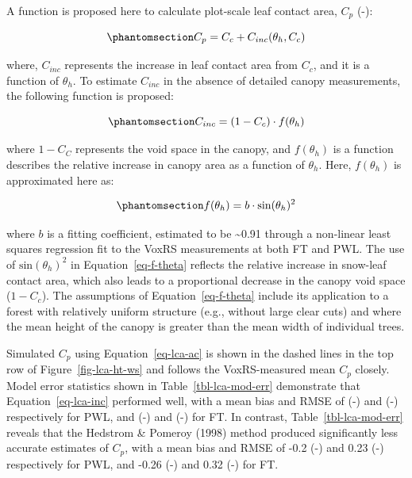 \documentclass[
  letterpaper,
  DIV=11,
  numbers=noendperiod]{scrartcl}
\begin{document}
A function is proposed here to calculate plot-scale leaf contact area,
\(C_p\) (-):

\begin{equation}\phantomsection\label{eq-lca-ac}{
C_p = C_c + C_{inc}(\theta_h, C_c)
}\end{equation}

where, \(C_{inc}\) represents the increase in leaf contact area from
\(C_c\), and it is a function of \(\theta_h\). To estimate \(C_{inc}\)
in the absence of detailed canopy measurements, the following function
is proposed:

\begin{equation}\phantomsection\label{eq-lca-inc}{
C_{inc} = (1-C_c)\cdot f(\theta_h)
}\end{equation}

where \(1-C_C\) represents the void space in the canopy, and
\(f(\theta_h)\) is a function describes the relative increase in canopy
area as a function of \(\theta_h\). Here, \(f(\theta_h)\) is
approximated here as:

\begin{equation}\phantomsection\label{eq-f-theta}{
f(\theta_h) = b \cdot\text{sin}(\theta_h)^2
}\end{equation}

where \(b\) is a fitting coefficient, estimated to be
\textasciitilde0.91 through a non-linear least squares regression fit to
the VoxRS measurements at both FT and PWL. The use of
\(\text{sin}(\theta_h)^2\) in Equation~\ref{eq-f-theta} reflects the
relative increase in snow-leaf contact area, which also leads to a
proportional decrease in the canopy void space (\(1-C_c\)). The
assumptions of Equation~\ref{eq-f-theta} include its application to a
forest with relatively uniform structure (e.g., without large clear
cuts) and where the mean height of the canopy is greater than the mean
width of individual trees.

Simulated \(C_p\) using Equation~\ref{eq-lca-ac} is shown in the dashed
lines in the top row of Figure~\ref{fig-lca-ht-ws} and follows the
VoxRS-measured mean \(C_p\) closely. Model error statistics shown in
Table~\ref{tbl-lca-mod-err} demonstrate that Equation~\ref{eq-lca-inc}
performed well, with a mean bias and RMSE of (-) and (-) respectively
for PWL, and (-) and (-) for FT. In contrast,
Table~\ref{tbl-lca-mod-err} reveals that the Hedstrom \& Pomeroy (1998)
method produced significantly less accurate estimates of \(C_p\), with a
mean bias and RMSE of -0.2 (-) and 0.23 (-) respectively for PWL, and
-0.26 (-) and 0.32 (-) for FT.
\end{document}
